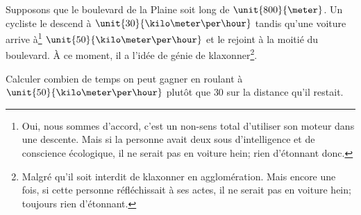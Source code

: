 
\begin{exercice}\label{exoMRU0001}

	Supposons que le boulevard de la Plaine soit long de $\unit{800}{\meter}$. Un cycliste le descend à $\unit{30}{\kilo\meter\per\hour}$ tandis qu'une voiture arrive à\footnote{Oui, nous sommes d'accord, c'est un non-sens total d'utiliser son moteur dans une descente. Mais si la personne avait deux sous d'intelligence et de conscience écologique, il ne serait pas en voiture hein; rien d'étonnant donc.} $\unit{50}{\kilo\meter\per\hour}$ et le rejoint à la moitié du boulevard. À ce moment, il a l'idée de génie de klaxonner\footnote{Malgré qu'il soit interdit de klaxonner en agglomération. Mais encore une fois, si cette personne réfléchissait à ses actes, il ne serait pas en voiture hein; toujours rien d'étonnant.}.

	Calculer combien de temps on peut gagner en roulant à $\unit{50}{\kilo\meter\per\hour}$ plutôt que $30$ sur la distance qu'il restait.

\end{exercice}

